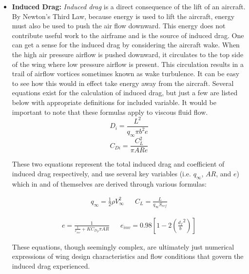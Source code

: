 \documentclass{article}
\begin{document}
\begin{itemize}
        \begin{itemize}
            \item \textbf{Induced Drag:} \textit{Induced drag} is a direct consequence of the lift of an aircraft. By Newton's Third Law, because energy is used to lift
            the aircraft, energy must also be used to push the air flow downward. This energy does not contribute useful work to the airframe and is the source of induced drag.
            One can get a sense for the induced drag by considering the aircraft wake. When the high air pressure airflow is pushed downward, it circulates to the top side of the wing
            where low pressure airflow is present. This circulation results in a trail of airflow vortices sometimes known as wake turbulence. It can be easy to see how this would 
            in effect take energy away from the aircraft. Several equations exist for the calculation of induced drag, but just a few are listed below with appropriate definitions for included variable.
            It would be important to note that these formulas apply to viscous fluid flow.
            \begin{equation}
            D_i = \frac{L^2}{q_{\infty}\pi b^2 e}
            \end{equation}
            \begin{equation}
            C_{Di} = \frac{C_L^2}{\pi ARe}\label{eq:drag_eq}
            \end{equation}

            These two equations represent the total induced drag and coefficient of induced drag respectively,
            and use several key variables (i.e. $q_{\infty}$, $AR$, and $e$) which in and of themselves are derived through
            various formulas:

            \begin{align*}
            q_{\infty} = \frac{1}{2} \rho V_{\infty}^2 && C_L = \frac{L}{q_{\infty} S_{ref}}
            \end{align*}

            \begin{align*}
            e = \frac{1}{\displaystyle \frac{1}{e_{inv}}+KC_{D_P}\pi AR}  && e_{inv} = 0.98\left[1-2\left(\frac{d_f}{b}^2  \right) \right]
            \end{align*}
            
            These equations, though seemingly complex, are ultimately just numerical expressions of wing design characteristics and
            flow conditions that govern the induced drag experienced.


\end{itemize}
\end{itemize}
\end{document}
